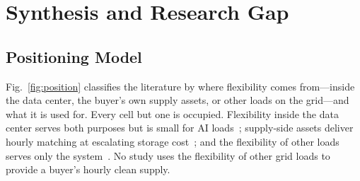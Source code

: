 \documentclass[conference]{IEEEtran}
\begin{document}
\section{Synthesis and Research Gap}
\subsection{Positioning Model}
Fig.~\ref{fig:position} classifies the literature by where flexibility comes from---inside the data center, the buyer's own supply assets, or other loads on the grid---and what it is used for. Every cell but one is occupied. Flexibility inside the data center serves both purposes but is small for AI loads~\cite{r26}; supply-side assets deliver hourly matching at escalating storage cost~\cite{r15}; and the flexibility of other loads serves only the system~\cite{r17,r18,r23}. No study uses the flexibility of other grid loads to provide a buyer's hourly clean supply.
\end{document}
